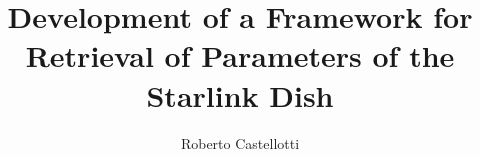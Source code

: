 \usepackage[utf8]{inputenc}
\usepackage{packages}
\usepackage{beamermods}

\author[Roberto Castellotti]{Roberto Castellotti}
\title[IDP]{Development of a Framework for Retrieval of Parameters of the Starlink Dish}






\usepackage{pgfpages}
\usepackage{ifthen}
\newif\ifsolution%

\makeatletter
\let\@@magyar@captionfix\relax
\makeatother

